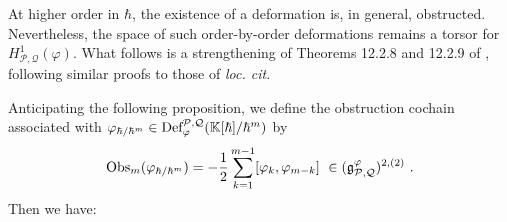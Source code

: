\documentclass[11pt]{amsart}
\numberwithin{equation}{section}
\theoremstyle{definition}
\newcommand{\bb}{\mathbb}
\newcommand{\mc}{\mathcal}
\newcommand{\mf}{\mathfrak}
\newcommand{\Def}{{\textup{Def}}}
\newcommand{\K}{{\bb K}}
\newcommand{\Obs}{{\textup{Obs}}}
\newcommand{\0}{{\textbf{0}}}
\newcommand{\g}{{\mf{g}}}
\def\PP{{\mc P}}
\def\QQ{{\mc Q}}
\def \mf{\mathfrak}
\begin{document}
At higher order in $\hbar$, the existence of a deformation is, in general, obstructed. Nevertheless, the space of such order-by-order deformations remains a torsor for $H^1_{\PP,\QQ}(\varphi)$. What follows is a strengthening of Theorems 12.2.8 and 12.2.9 of \cite{LV}, following similar proofs to those of \emph{loc. cit.}

Anticipating the following proposition, we define the obstruction cochain associated with $\varphi_{\hbar/\hbar^{m}}\in \Def^{\mc P,\mc Q}_\varphi(\K[\hbar]/\hbar^{m}) $ by
\[ \Obs_m(\varphi_{\hbar/\hbar^{m}})=-\frac{1}{2} \sum_{k=1}^{m-1}[ \varphi_k,\varphi_{m-k} ] \ \in (\g_{\mc P, \mc Q}^{\varphi})^{2,(2)} \ . \]
Then we have:
\end{document}
